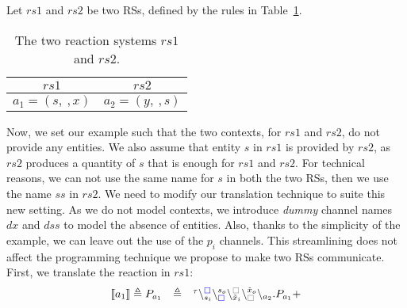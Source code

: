 \begin{example}
\label{ex:twoRS}
Let  $rs1$ and $rs2$ be two RSs, defined by the rules in Table~\ref{tab:rules}.


\begin{table}[t]
\centering
\begin{tabular}{|c|c|}
\hline
$rs1$  & $rs2$ \\
\hline
$a_1=(s,\ , x)$ & $a_2=(y,\  ,s)$\\
\hline 
\end{tabular}
\caption{The two reaction systems $rs1$ and $rs2$.}
\label{tab:rules}
\end{table}
 \noindent
Now, we set our example such that the two contexts, for  $rs1$ and $rs2$, do not provide any entities.
We also assume that entity $s$ in $rs1$ is provided by $rs2$, as $rs2$ produces a quantity of $s$ that is enough for $rs1$ and $rs2$.
For technical reasons, we can not use the same name for  $s$ in both the two RSs, then we use the name $ss$ in $rs2$.
%
We need to modify our translation technique to suite this new setting. 
As we do not model contexts, we introduce  \emph{dummy} channel names $dx$ and $dss$ to model the absence of entities. Also, thanks to the simplicity of the example, we can leave out the use of the   $p_i$ channels. This streamlining does not affect the programming technique we propose to make two RSs communicate.
First, we translate the reaction in $rs1$:
\[
\begin{array}{lcl}
\llbracket a_1\rrbracket \defeq P_{a_1}&\defeq &
\startchain{\silent}\chainedlink{s_i}{{\color{blue}\noact}}\chainedlink{{\color{blue}\noact}}{s_o}\chainedlink{\tilde{x}_i}{{\color{gray}\noact}}\chainedlink{{\color{gray}\noact}}{\tilde{x}_o}\chainend{a_2}.P_{a_1} +

\end{array}\]
\end{example}
